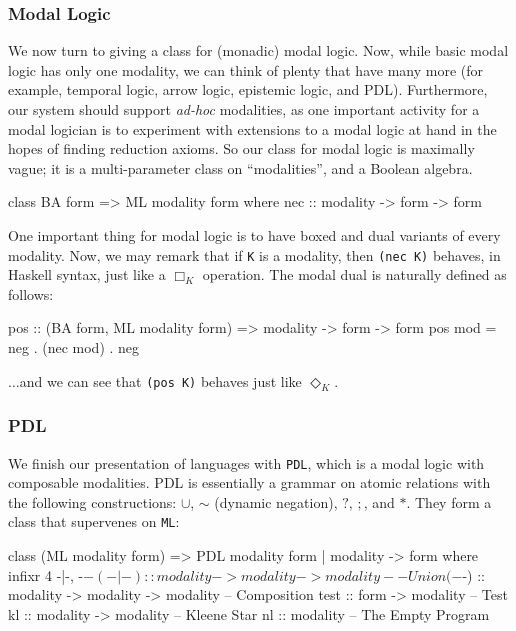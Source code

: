 \documentclass[11pt]{article}
\theoremstyle{definition}
\begin{document}
\subsubsection{Modal Logic}

We now turn to giving a class for (monadic) modal logic.  Now, while basic modal logic has only one modality, we can think of plenty that have many more (for example, temporal logic, arrow logic, epistemic logic, and PDL).  Furthermore, our system should support \emph{ad-hoc} modalities, as one important activity for a modal logician is to experiment with extensions to a modal logic at hand in the hopes of finding reduction axioms.  So our class for modal logic is maximally vague; it is a multi-parameter class on ``modalities'', and a Boolean algebra.

\begin{code}
class BA form => ML modality form where
  nec :: modality -> form -> form              
\end{code}

One important thing for modal logic is to have boxed and dual variants of every modality.  Now, we may remark that if \texttt{K} is a modality, then \texttt{(nec K)} behaves, in Haskell syntax, just like a $\Box_K$ operation.  The modal dual is naturally defined as follows:

\begin{code}
pos :: (BA form, ML modality form) => modality -> form -> form
pos mod = neg . (nec mod) . neg
\end{code}

$\ldots$and we can see that \texttt{(pos K)} behaves just like $\Diamond_K$.

\subsubsection{PDL}
We finish our presentation of languages with \texttt{PDL}, which is a modal logic with composable modalities.  PDL is essentially a grammar on atomic relations with the following constructions: $\cup$, $\sim$ (dynamic negation), $?$, $;$, and $\ast$. They form a class that supervenes on \texttt{ML}:

\begin{code}
class (ML modality form) => PDL modality form | modality -> form where
  infixr 4 -|-, -$-
  (-|-) :: modality -> modality -> modality        -- Union
  (-$-) :: modality -> modality -> modality        -- Composition
  test :: form -> modality                         -- Test
  kl :: modality -> modality                       -- Kleene Star
  nl :: modality                                   -- The Empty Program
\end{code}
\end{document}
